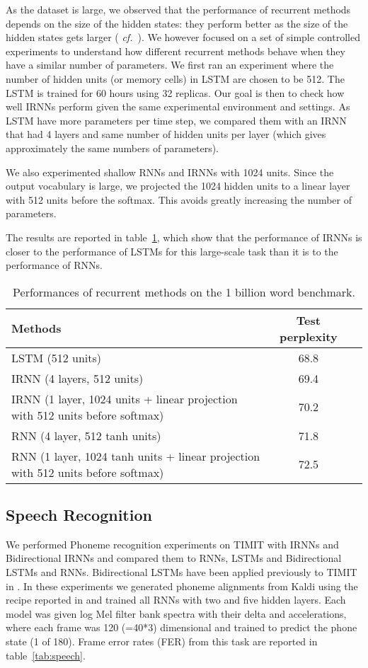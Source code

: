\documentclass{article} \usepackage{nips14submit_e,times,graphicx}
\begin{document}
As the dataset is large, we observed that the performance of recurrent
methods depends on the size of the hidden states: they perform better
as the size of the hidden states gets larger ({\it
  cf.}~\cite{DBLP:journals/corr/ChelbaMSGBK13}). We however focused on
a set of simple controlled experiments to understand how different
recurrent methods behave when they have a similar number of
parameters. We first ran an experiment where the number of hidden
units (or memory cells) in LSTM are chosen to be 512. The LSTM is
trained for 60 hours using 32 replicas. Our goal is then to check how
well IRNNs perform given the same experimental environment and
settings. As LSTM have more parameters per time step, we compared them
with an IRNN that had 4 layers and same number of hidden units per
layer (which gives approximately the same numbers of parameters).

We also experimented shallow RNNs and IRNNs with 1024 units. Since the
output vocabulary is large, we projected the 1024 hidden units to a
linear layer with 512 units before the softmax.  This avoids greatly
increasing the number of parameters.

The results are reported in table~\ref{tab:1b}, which show that the
performance of IRNNs is closer to the performance of LSTMs for this
large-scale task than it is to the performance of RNNs.


\begin{table}[h!]
\centering
\begin{tabular}{|l|c|c|}
\hline
{\bf Methods}         &  {\bf Test perplexity} \\\hline \hline
LSTM (512 units)   &  68.8            \\
IRNN (4 layers, 512 units)   &  69.4            \\
IRNN (1 layer, 1024 units + linear projection with 512 units before softmax)  &  70.2            \\
RNN (4 layer, 512 tanh units)  &  71.8            \\
RNN (1 layer, 1024 tanh units + linear projection with 512 units before softmax)  &  72.5            \\\hline \end{tabular}
\caption{Performances of recurrent methods on the 1 billion word
  benchmark.}
\label{tab:1b}
\end{table}

\subsection{Speech Recognition}
We performed Phoneme recognition experiments on TIMIT with IRNNs and
Bidirectional IRNNs and compared them to RNNs, LSTMs and Bidirectional
LSTMs and RNNs. Bidirectional LSTMs have been applied previously to TIMIT
in \cite{graves2013hybrid}. In these experiments we generated phoneme
alignments from Kaldi \cite{Kaldi} using the recipe reported in
\cite{jaitly2014exploring} and trained all RNNs with two and five
hidden layers. Each model was given log Mel filter bank spectra with
their delta and accelerations, where each frame was 120 (=40*3)
dimensional and trained to predict the phone state (1 of 180). Frame
error rates (FER) from this task are reported in
table~\ref{tab:speech}.
\end{document}
